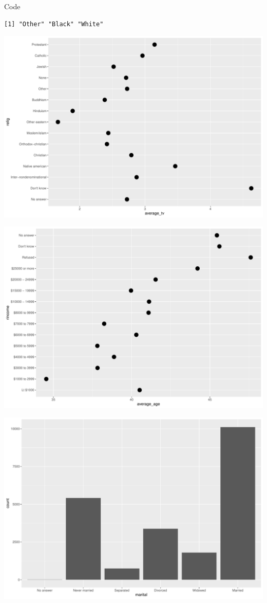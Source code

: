 \documentclass[
  ignorenonframetext,
]{beamer}
\begin{document}
\begin{frame}[fragile]{Code}
\begin{verbatim}
[1] "Other" "Black" "White"
\end{verbatim}

\includegraphics{gss_cat_files/figure-beamer/unnamed-chunk-1-1.pdf}

\includegraphics{gss_cat_files/figure-beamer/unnamed-chunk-1-2.pdf}

\includegraphics{gss_cat_files/figure-beamer/unnamed-chunk-1-3.pdf}


\end{frame}
\end{document}
